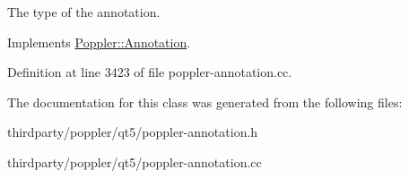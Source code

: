 The type of the annotation. 

Implements \hyperlink{class_poppler_1_1_annotation_aef7fa1532193b41fbeba6e577579d984}{Poppler\+::\+Annotation}.



Definition at line 3423 of file poppler-\/annotation.\+cc.



The documentation for this class was generated from the following files\+:\begin{DoxyCompactItemize}
\item 
thirdparty/poppler/qt5/poppler-\/annotation.\+h\item 
thirdparty/poppler/qt5/poppler-\/annotation.\+cc\end{DoxyCompactItemize}
